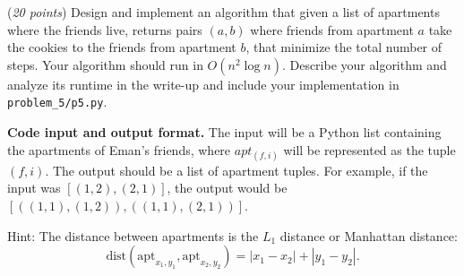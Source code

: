 \documentclass{hw}
\newcommand{\io}{\textbf{Code input and output format.} }
\begin{document}
\begin{problem}
  (\textit{20 points}) Design and implement an algorithm that given a list of apartments where the friends live, returns pairs $(a, b)$ where friends from apartment $a$ take the cookies to the friends from apartment $b$, that minimize the total number of steps. Your algorithm should run in $O(n^2 \log n)$.
  Describe your algorithm and analyze its runtime in the write-up and include your implementation in \texttt{problem\_5/p5.py}.

  
  \io The input will be a Python list containing the apartments of Eman's friends, where $apt_{(f,i)}$ will be represented as the tuple $(f, i)$. The output should be a list of apartment tuples.
  For example, if the input was $[(1,2), (2,1)]$, the output would be $[((1,1), (1,2)), ((1,1), (2,1))]$.

  Hint: The distance between apartments is the $L_1$ distance or Manhattan distance:
  $$\text{dist}(\text{apt}_{x_1,y_1}, \text{apt}_{x_2,y_2}) = |x_1 - x_2| + |y_1 - y_2|.$$
  
\end{problem}
%
%
%
%
%
%
%
%
%
\end{document}
